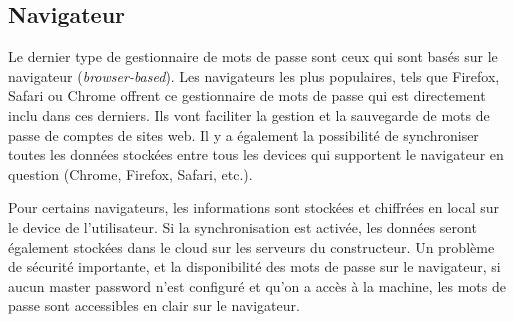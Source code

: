 \subsection{Navigateur}
Le dernier type de gestionnaire de mots de passe sont ceux qui sont basés sur le navigateur (\textit{browser-based}). Les navigateurs les plus populaires, tels que Firefox, Safari ou Chrome offrent ce gestionnaire de mots de passe qui est directement inclu dans ces derniers.
Ils vont faciliter la gestion et la sauvegarde de mots de passe de comptes de sites web. Il y a également la possibilité de synchroniser toutes les données stockées entre tous les devices qui supportent le navigateur en question (Chrome, Firefox, Safari, etc.).

Pour certains navigateurs, les informations sont stockées et chiffrées en local sur le device de l'utilisateur. Si la synchronisation est activée, les données seront également stockées dans le cloud sur les serveurs du constructeur. Un problème de sécurité importante, et la disponibilité des mots de passe sur le navigateur, si aucun master password n'est configuré et qu'on a accès à la machine, les mots de passe sont accessibles en clair sur le navigateur.
